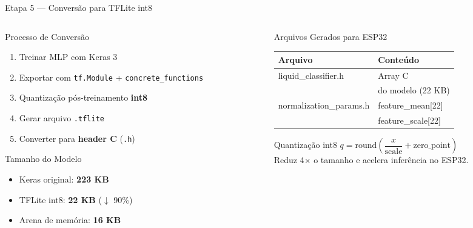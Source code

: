 \documentclass[aspectratio=169, 11pt]{beamer}
\begin{document}
\begin{frame}{Etapa 5 — Conversão para TFLite int8}
  \begin{columns}[T]
    \begin{column}{0.5\textwidth}
      \begin{block}{Processo de Conversão}
        \begin{enumerate}
          \item Treinar MLP com Keras 3
          \item Exportar com \texttt{tf.Module} + \texttt{concrete\_functions}
          \item Quantização pós-treinamento \textbf{int8}
          \item Gerar arquivo \texttt{.tflite}
          \item Converter para \textbf{header C} (\texttt{.h})
        \end{enumerate}
      \end{block}
      \vspace{0.2cm}
      \begin{exampleblock}{Tamanho do Modelo}
        \begin{itemize}
          \item Keras original: \textbf{223 KB}
          \item TFLite int8: \textbf{22 KB} ($\downarrow$ 90\%)
          \item Arena de memória: \textbf{16 KB}
        \end{itemize}
      \end{exampleblock}
    \end{column}
    \begin{column}{0.45\textwidth}
      \begin{block}{Arquivos Gerados para ESP32}
        \ttfamily\scriptsize
        \begin{tabular}{ll}
          \toprule
          \textbf{Arquivo} & \textbf{Conteúdo} \\
          \midrule
          liquid\_classifier.h & Array C \\
                               & do modelo (22 KB) \\
          \midrule
          normalization\_params.h & feature\_mean[22] \\
                                  & feature\_scale[22] \\
          \bottomrule
        \end{tabular}
      \end{block}
      \vspace{0.3cm}
      \begin{alertblock}{Quantização int8}
        \small
        $q = \text{round}\left(\dfrac{x}{\text{scale}} + \text{zero\_point}\right)$
        \vspace{0.1cm}
        \\Reduz 4$\times$ o tamanho e acelera inferência no ESP32.
      \end{alertblock}
    \end{column}
  \end{columns}
\end{frame}
\end{document}
